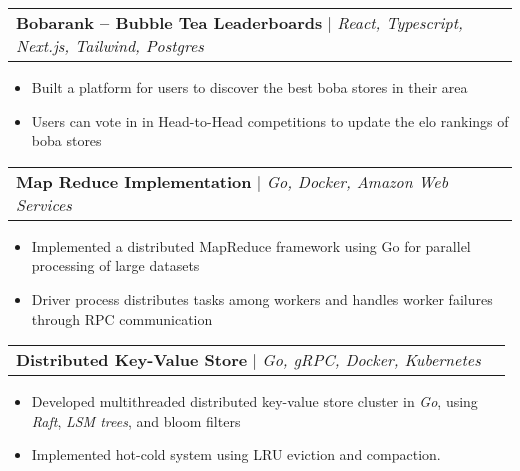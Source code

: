 \documentclass[letterpaper,11pt]{article}
\makeatletter
\newcommand{\resumeItem}[1]{
  \item\small{
    {#1 \vspace{-2pt}}
  }
}
\newcommand{\resumeProjectHeading}[2]{
    \item
    \begin{tabular*}{0.97\textwidth}{l@{\extracolsep{\fill}}r}
      \small#1 & #2 \\
    \end{tabular*}\vspace{-7pt}
}
\newcommand{\resumeItemListStart}{\begin{itemize}}
\newcommand{\resumeItemListEnd}{\end{itemize}\vspace{-5pt}}
\makeatother
\begin{document}
        \resumeProjectHeading
          {\textbf{Bobarank -- Bubble Tea Leaderboards} $|$ \emph{React, Typescript, Next.js, Tailwind, Postgres}}{}
          \resumeItemListStart
          \resumeItem{Built a platform for users to discover the best boba stores in their area}
          \resumeItem{Users can vote in in Head-to-Head competitions to update the elo rankings of boba stores}
          \resumeItemListEnd


        \resumeProjectHeading
        {\textbf{Map Reduce Implementation} $|$ \emph{Go, Docker, Amazon Web Services}}{}
        \resumeItemListStart

          \resumeItem{Implemented a distributed MapReduce framework using Go for parallel processing of large datasets}
          \resumeItem{Driver process distributes tasks among workers and handles worker failures through RPC communication}
          \resumeItemListEnd


        \resumeProjectHeading
          {\textbf{Distributed Key-Value Store} $|$ \emph{Go, gRPC, Docker, Kubernetes}}{}
          \resumeItemListStart
            \resumeItem{Developed multithreaded distributed key-value store cluster in \textit{Go}, using \textit{Raft}, \textit{LSM trees}, and bloom filters}
            \resumeItem{Implemented hot-cold system using LRU eviction and compaction. }
          \resumeItemListEnd
\end{document}
